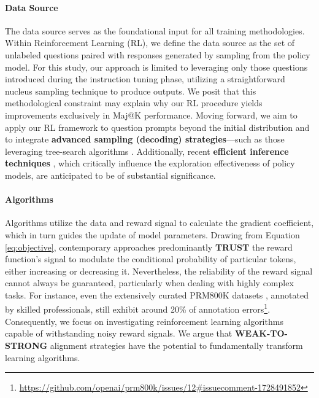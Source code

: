 \begin{itemize}[topsep=0pt]
\begin{itemize}[topsep=0pt]
\paragraph{Data Source} The data source serves as the foundational input for all training methodologies. Within Reinforcement Learning (RL), we define the data source as the set of unlabeled questions paired with responses generated by sampling from the policy model. For this study, our approach is limited to leveraging only those questions introduced during the instruction tuning phase, utilizing a straightforward nucleus sampling technique to produce outputs. We posit that this methodological constraint may explain why our RL procedure yields improvements exclusively in Maj@K performance. Moving forward, we aim to apply our RL framework to question prompts beyond the initial distribution and to integrate \textbf{advanced sampling (decoding) strategies}—such as those leveraging tree-search algorithms \citep{yao2023tree}. Additionally, recent \textbf{efficient inference techniques} \citep{xia-etal-2023-speculative,leviathan2023fast,kwon2023efficient,xia2024unlocking}, which critically influence the exploration effectiveness of policy models, are anticipated to be of substantial significance.

\paragraph{Algorithms} Algorithms utilize the data and reward signal to calculate the gradient coefficient, which in turn guides the update of model parameters. Drawing from Equation \ref{eq:objective}, contemporary approaches predominantly \textbf{TRUST} the reward function's signal to modulate the conditional probability of particular tokens, either increasing or decreasing it. Nevertheless, the reliability of the reward signal cannot always be guaranteed, particularly when dealing with highly complex tasks. For instance, even the extensively curated PRM800K datasets \citep{lightman2023let}, annotated by skilled professionals, still exhibit around 20\% of annotation errors\footnote{\url{https://github.com/openai/prm800k/issues/12\#issuecomment-1728491852}}. Consequently, we focus on investigating reinforcement learning algorithms capable of withstanding noisy reward signals. We argue that \textbf{WEAK-TO-STRONG} alignment strategies \citep{burns2023weak} have the potential to fundamentally transform learning algorithms.


\end{itemize}
\end{itemize}
